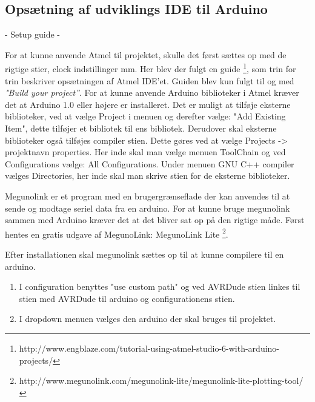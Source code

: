 \subsection{Opsætning af udviklings IDE til Arduino}

- Setup guide
- 


For at kunne anvende Atmel til projektet, skulle det først sættes op med de rigtige stier, clock indstillinger mm. Her blev der fulgt en guide \footnote{http://www.engblaze.com/tutorial-using-atmel-studio-6-with-arduino-projects/}, som trin for trin beskriver opsætningen af Atmel IDE'et. Guiden blev kun fulgt til og med \textit{"Build your project”}. 
For at kunne anvende Arduino biblioteker i Atmel kræver det at Arduino 1.0 eller højere er installeret. Det er muligt at tilføje eksterne biblioteker, ved at vælge Project i menuen og derefter vælge: "Add Existing Item", dette tilføjer et bibliotek til ens bibliotek. Derudover skal eksterne biblioteker også tilføjes compiler stien. Dette gøres ved at vælge Projects -> projektnavn properties. Her inde skal man vælge menuen ToolChain og ved Configurations vælge: All Configurations. Under menuen GNU C++ compiler vælges Directories, her inde skal man skrive stien for de eksterne biblioteker.

Megunolink er et program med en brugergrænseflade der kan anvendes til at sende og modtage seriel data fra en arduino.
For at kunne bruge megunolink sammen med Arduino kræver det at det bliver sat op på den rigtige måde.
Først hentes en gratis udgave af MegunoLink: MegunoLink Lite \footnote{http://www.megunolink.com/megunolink-lite/megunolink-lite-plotting-tool/}.

Efter installationen skal megunolink sættes op til at kunne compilere til en arduino.

\begin{enumerate}
	\item I configuration benyttes "use custom path" og ved AVRDude stien linkes til stien med AVRDude til arduino og configurationens stien. 
	\item I dropdown menuen vælges den arduino der skal bruges til projektet.
\end{enumerate}

\newpage


